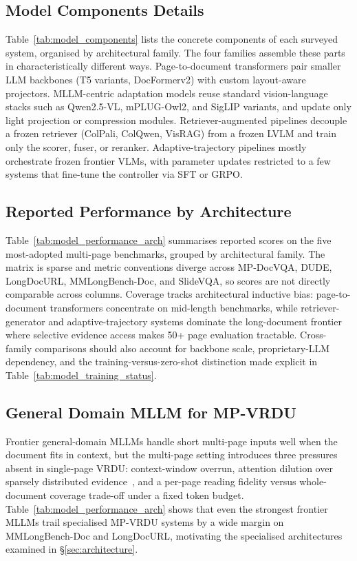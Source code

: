 \documentclass[11pt]{article}
\begin{document}
\subsection{Model Components Details}
\label{app:components}
Table~\ref{tab:model_components} lists the concrete components of each surveyed system, organised by architectural family. The four families assemble these parts in characteristically different ways. Page-to-document transformers pair smaller LLM backbones (T5 variants, DocFormerv2) with custom layout-aware projectors. MLLM-centric adaptation models reuse standard vision-language stacks such as Qwen2.5-VL, mPLUG-Owl2, and SigLIP variants, and update only light projection or compression modules. Retriever-augmented pipelines decouple a frozen retriever (ColPali, ColQwen, VisRAG) from a frozen LVLM and train only the scorer, fuser, or reranker. Adaptive-trajectory pipelines mostly orchestrate frozen frontier VLMs, with parameter updates restricted to a few systems that fine-tune the controller via SFT or GRPO.


\subsection{Reported Performance by Architecture}
\label{app:performance}
Table~\ref{tab:model_performance_arch} summarises reported scores on the five most-adopted multi-page benchmarks, grouped by architectural family. The matrix is sparse and metric conventions diverge across MP-DocVQA, DUDE, LongDocURL, MMLongBench-Doc, and SlideVQA, so scores are not directly comparable across columns. Coverage tracks architectural inductive bias: page-to-document transformers concentrate on mid-length benchmarks, while retriever-generator and adaptive-trajectory systems dominate the long-document frontier where selective evidence access makes 50+ page evaluation tractable. Cross-family comparisons should also account for backbone scale, proprietary-LLM dependency, and the training-versus-zero-shot distinction made explicit in Table~\ref{tab:model_training_status}.

\subsection{General Domain MLLM for MP-VRDU}
\label{app:general-MLLM}
Frontier general-domain MLLMs handle short multi-page inputs well when the document fits in context, but the multi-page setting introduces three pressures absent in single-page VRDU: context-window overrun, attention dilution over sparsely distributed evidence~\cite{liu2024lost}, and a per-page reading fidelity versus whole-document coverage trade-off under a fixed token budget. Table~\ref{tab:model_performance_arch} shows that even the strongest frontier MLLMs trail specialised MP-VRDU systems by a wide margin on MMLongBench-Doc and LongDocURL, motivating the specialised architectures examined in \S\ref{sec:architecture}.
\end{document}
